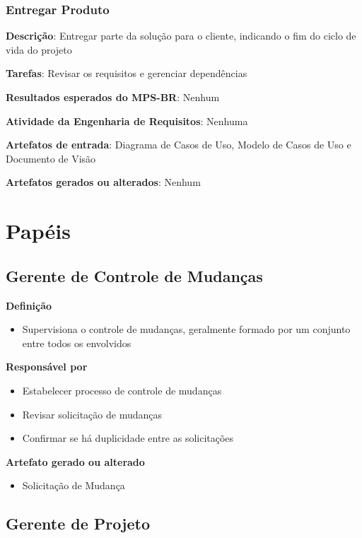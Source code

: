 \subsubsection{Entregar Produto}

\begin{description}
\item\textbf{Descrição}: Entregar parte da solução para o cliente, indicando o fim do ciclo de vida do projeto
\item\textbf{Tarefas}: Revisar os requisitos e gerenciar dependências
\item\textbf{Resultados esperados do MPS-BR}: Nenhum
\item\textbf{Atividade da Engenharia de Requisitos}: Nenhuma
\item\textbf{Artefatos de entrada}: Diagrama de Casos de Uso, Modelo de Casos de Uso e Documento de Visão
\item\textbf{Artefatos gerados ou alterados}: Nenhum
\end{description}

\section{Papéis}

\subsection{Gerente de Controle de Mudanças}

\textbf{Definição}
\begin{itemize}
\item Supervisiona o controle de mudanças, geralmente formado por um conjunto entre todos os envolvidos
\end{itemize}

\textbf{Responsável por}
\begin{itemize}
\item Estabelecer processo de controle de mudanças
\item Revisar solicitação de mudanças
\item Confirmar se há duplicidade entre as solicitações
\end{itemize}

\textbf{Artefato gerado ou alterado}
\begin{itemize}
\item Solicitação de Mudança
\end{itemize}

\subsection{Gerente de Projeto}

